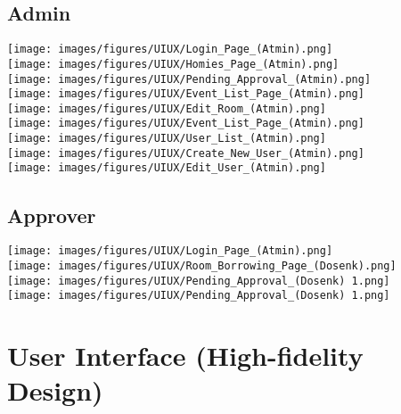 \documentclass[12pt,titlepage,a4paper]{report}
\begin{document}
    \subsection{Admin}
    \begin{center}
        \texttt{[image: images/figures/UIUX/Login\_Page\_(Atmin).png]}\\
        \texttt{[image: images/figures/UIUX/Homies\_Page\_(Atmin).png]}\\
        \texttt{[image: images/figures/UIUX/Pending\_Approval\_(Atmin).png]}\\
        \texttt{[image: images/figures/UIUX/Event\_List\_Page\_(Atmin).png]}\\
        \texttt{[image: images/figures/UIUX/Edit\_Room\_(Atmin).png]}\\
        \texttt{[image: images/figures/UIUX/Event\_List\_Page\_(Atmin).png]}\\
        \texttt{[image: images/figures/UIUX/User\_List\_(Atmin).png]}\\
        \texttt{[image: images/figures/UIUX/Create\_New\_User\_(Atmin).png]}\\
        \texttt{[image: images/figures/UIUX/Edit\_User\_(Atmin).png]}\\
    \end{center}
    \newpage
    \subsection{Approver}
    \begin{center}
        \texttt{[image: images/figures/UIUX/Login\_Page\_(Atmin).png]}\\
        \texttt{[image: images/figures/UIUX/Room\_Borrowing\_Page\_(Dosenk).png]}\\
        \texttt{[image: images/figures/UIUX/Pending\_Approval\_(Dosenk) 1.png]}\\
        \texttt{[image: images/figures/UIUX/Pending\_Approval\_(Dosenk) 1.png]}\\
    \end{center}
    \newpage
    \section{User Interface (High-fidelity Design)}
\end{document}
